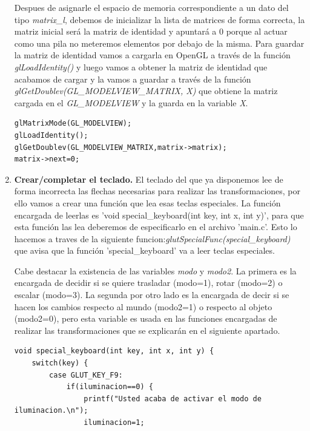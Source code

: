 \documentclass[12pt,a4paper]{article}
\begin{document}
\begin{enumerate}
Despues de asignarle el espacio de memoria correspondiente a un dato del tipo \textit{matrix\_l}, debemos de inicializar la lista de matrices de forma correcta, la matriz inicial será la matriz de identidad y apuntará a 0 porque al actuar como una pila no meteremos elementos por debajo de la misma. Para guardar la matriz de identidad vamos a cargarla en OpenGL a través de la función \textit{glLoadIdentity()} y luego vamos a obtener la matriz de identidad que acabamos de cargar y la vamos a guardar a través de la función \textit{glGetDoublev(GL\_MODELVIEW\_MATRIX, X)} que obtiene la matriz cargada en el \textit{GL\_MODELVIEW} y la guarda en la variable \textit{X}.\newline

\begin{lstlisting}
glMatrixMode(GL_MODELVIEW);
glLoadIdentity();
glGetDoublev(GL_MODELVIEW_MATRIX,matrix->matrix);
matrix->next=0;
\end{lstlisting}



\item \textbf{Crear/completar el teclado.}\newline
El teclado del que ya disponemos lee de forma incorrecta las flechas necesarias para realizar las transformaciones, por ello vamos a crear una función que lea esas teclas especiales. La función encargada de leerlas es 'void special\_keyboard(int key, int x, int y)', para que esta función las lea deberemos de especificarlo en el archivo 'main.c'. Esto lo hacemos a traves de la siguiente funcion:\textit{glutSpecialFunc(special\_keyboard)} que avisa que la función 'special\_keyboard' va a leer teclas especiales.\newline

Cabe destacar la existencia de las variables \textit{modo} y \textit{modo2}. La primera es la encargada de decidir si se quiere trasladar (modo=1), rotar (modo=2) o escalar (modo=3). La segunda por otro lado es la encargada de decir si se hacen los cambios respecto al mundo (modo2=1) o respecto al objeto (modo2=0), pero esta variable es usada en las funciones encargadas de realizar las transformaciones que se explicarán en el siguiente apartado.\newline
\begin{lstlisting}
void special_keyboard(int key, int x, int y) {
    switch(key) {
        case GLUT_KEY_F9:
            if(iluminacion==0) {
                printf("Usted acaba de activar el modo de iluminacion.\n");
                iluminacion=1;


\end{lstlisting}
\end{enumerate}
\end{document}
